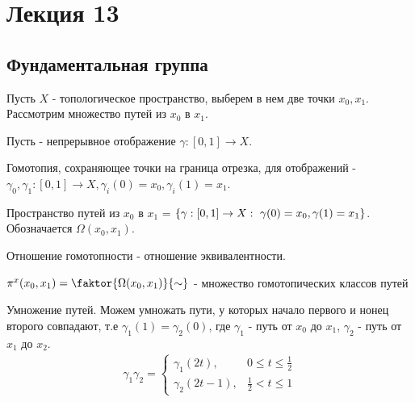\section{Лекция 13}

\subsection{Фундаментальная группа}

Пусть $X$ - топологическое пространство, выберем в нем две точки $x_0, x_1$. Рассмотрим множество путей из $x_0$ в $x_1$.

\begin{definition}
    Пусть - непрерывное отображение $\gamma: [0,1] \rightarrow X$.
\end{definition}

\begin{definition}
    Гомотопия, сохраняющее точки на граница отрезка, для отображений - $\gamma_0, \gamma_1: [0,1] \rightarrow X, \gamma_i(0) = x_0, \gamma_i(1) = x_1$.
\end{definition}

\begin{definition}
    Пространство путей из $x_0$ в $x_1$ = $\cbr{\gamma : [0,1] \rightarrow X : \ \gamma(0) = x_0, \gamma(1) = x_1}$. Обозначается $\Omega(x_0, x_1)$.
\end{definition}

\begin{nota_bene}
    Отношение гомотопности - отношение эквивалентности.
\end{nota_bene}

\begin{definition}
    $\pi^{x}(x_0, x_1) = \faktor{\Omega(x_0, x_1)}{\sim}$ - множество гомотопических классов путей
\end{definition}

Умножение путей. Можем умножать пути, у которых начало первого и нонец второго совпадают, т.е $\gamma_1(1) = \gamma_2(0)$, где $\gamma_1$ - путь от $x_0$ до $x_1$, $\gamma_2$ - путь от $x_1$ до $x_2$.
\begin{align}
    \gamma_1 \gamma_2 = \begin{cases}
        \gamma_1 (2t), & 0 \leq t \leq \frac{1}{2} \\
        \gamma_2 (2t - 1), & \frac{1}{2} < t \leq 1
    \end{cases}
\end{align}

